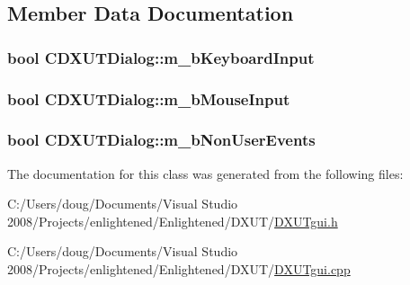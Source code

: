 \subsection{Member Data Documentation}
\hypertarget{class_c_d_x_u_t_dialog_ab298c311bb2389a8928c0650f8da4df8}{
\subsubsection[{m\_\-bKeyboardInput}]{\setlength{\rightskip}{0pt plus 5cm}bool {\bf CDXUTDialog::m\_\-bKeyboardInput}}}
\label{class_c_d_x_u_t_dialog_ab298c311bb2389a8928c0650f8da4df8}
\hypertarget{class_c_d_x_u_t_dialog_a4e6779884aa890d660bf43072ff15b2f}{
\subsubsection[{m\_\-bMouseInput}]{\setlength{\rightskip}{0pt plus 5cm}bool {\bf CDXUTDialog::m\_\-bMouseInput}}}
\label{class_c_d_x_u_t_dialog_a4e6779884aa890d660bf43072ff15b2f}
\hypertarget{class_c_d_x_u_t_dialog_a282063050d5cbad2b070ccafe9edb1d4}{
\subsubsection[{m\_\-bNonUserEvents}]{\setlength{\rightskip}{0pt plus 5cm}bool {\bf CDXUTDialog::m\_\-bNonUserEvents}}}
\label{class_c_d_x_u_t_dialog_a282063050d5cbad2b070ccafe9edb1d4}


The documentation for this class was generated from the following files:\begin{DoxyCompactItemize}
\item 
C:/Users/doug/Documents/Visual Studio 2008/Projects/enlightened/Enlightened/DXUT/\hyperlink{_d_x_u_tgui_8h}{DXUTgui.h}\item 
C:/Users/doug/Documents/Visual Studio 2008/Projects/enlightened/Enlightened/DXUT/\hyperlink{_d_x_u_tgui_8cpp}{DXUTgui.cpp}\end{DoxyCompactItemize}
